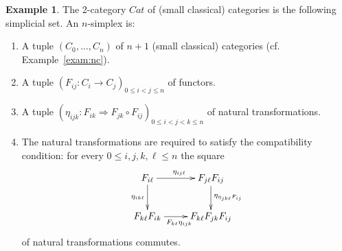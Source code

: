 \documentclass[a4paper]{amsart}
\numberwithin{figure}{section}
\theoremstyle{theorem}
\theoremstyle{definition}
\newtheorem{exam}[thm]{Example}
\begin{document}
\begin{exam} \label{exam:2cat}
The 2-category $Cat$ of (small classical) categories is the following simplicial set. An $n$-simplex is:
\begin{enumerate}
 \item A tuple $(C_0, \dots, C_n)$ of $n+1$ (small classical) categories (cf. Example~\ref{exam:nc}).
 \item A tuple $(F_{ij}: C_{i} \to C_{j})_{0 \leq i < j \leq n}$ of functors.
 \item A tuple $(\eta_{ijk}: F_{ik} \Rightarrow F_{jk} \circ F_{ij})_{0 \leq i < j < k \leq n}$ of natural transformations. 
 \item The natural transformations are required to satisfy the compatibility condition: for every $0 \leq i, j, k, \ell \leq n$ the square 
 \[ \xymatrix{
F_{i\ell} \ar[r]^{\eta_{ij\ell}} \ar[d]_{\eta_{ik\ell}} & F_{j\ell}F_{ij} \ar[d]^{\eta_{\eta_{jk\ell} F_{ij}}} \\
F_{k\ell}F_{ik} \ar[r]_{F_{k\ell} \eta_{ijk}} &  F_{k\ell}F_{jk}F_{ij}
 } \]
of natural transformations commutes.
\end{enumerate}
\end{exam}
\end{document}
